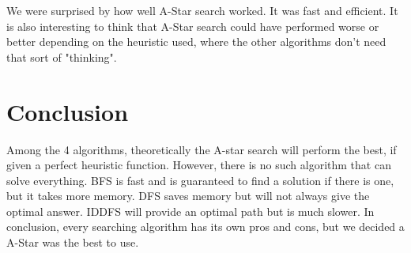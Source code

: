 \documentclass[onecolumn,draftclsnofoot, 10pt, compsoc]{IEEEtran}
\begin{document}
	We were surprised by how well A-Star search worked. It was fast and efficient. It is also interesting to think that A-Star search could have performed worse or better depending on the heuristic used, where the other algorithms don't need that sort of "thinking".
	
	
	
	
	\section{Conclusion}
	Among the 4 algorithms, theoretically the A-star search will perform the best, if given a perfect heuristic function. However, there is no such algorithm that can solve everything. BFS is fast and is guaranteed to find a solution if there is one, but it takes more memory. DFS saves memory but will not always give the optimal answer. IDDFS will provide an optimal path but is much slower. In conclusion, every searching algorithm has its own pros and cons, but we decided a A-Star was the best to use. 
    
	
	
\end{document}
